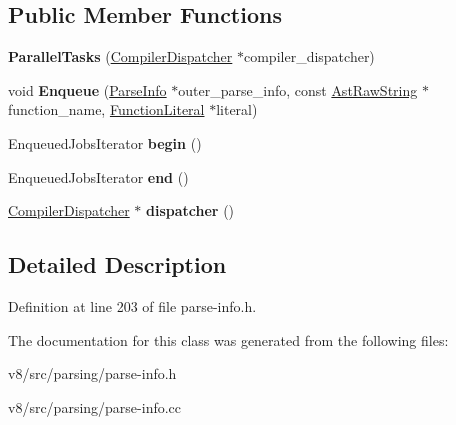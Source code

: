 \subsection*{Public Member Functions}
\begin{DoxyCompactItemize}
\item 
\mbox{\label{classv8_1_1internal_1_1ParseInfo_1_1ParallelTasks_ab6c9b1890ec00beea7053a2049278453}} 
{\bfseries Parallel\+Tasks} (\mbox{\hyperlink{classv8_1_1internal_1_1CompilerDispatcher}{Compiler\+Dispatcher}} $\ast$compiler\+\_\+dispatcher)
\item 
\mbox{\label{classv8_1_1internal_1_1ParseInfo_1_1ParallelTasks_a00dfb7c15caca76ce10ca8aad45eeb9a}} 
void {\bfseries Enqueue} (\mbox{\hyperlink{classv8_1_1internal_1_1ParseInfo}{Parse\+Info}} $\ast$outer\+\_\+parse\+\_\+info, const \mbox{\hyperlink{classv8_1_1internal_1_1AstRawString}{Ast\+Raw\+String}} $\ast$function\+\_\+name, \mbox{\hyperlink{classv8_1_1internal_1_1FunctionLiteral}{Function\+Literal}} $\ast$literal)
\item 
\mbox{\label{classv8_1_1internal_1_1ParseInfo_1_1ParallelTasks_ad32fa2b3ff55bbd600d5851963cba460}} 
Enqueued\+Jobs\+Iterator {\bfseries begin} ()
\item 
\mbox{\label{classv8_1_1internal_1_1ParseInfo_1_1ParallelTasks_a341230e654cf9994d9b7fd2cef334513}} 
Enqueued\+Jobs\+Iterator {\bfseries end} ()
\item 
\mbox{\label{classv8_1_1internal_1_1ParseInfo_1_1ParallelTasks_aad2af6077f22ae8cbdac3e23b2ed9839}} 
\mbox{\hyperlink{classv8_1_1internal_1_1CompilerDispatcher}{Compiler\+Dispatcher}} $\ast$ {\bfseries dispatcher} ()
\end{DoxyCompactItemize}


\subsection{Detailed Description}


Definition at line 203 of file parse-\/info.\+h.



The documentation for this class was generated from the following files\+:\begin{DoxyCompactItemize}
\item 
v8/src/parsing/parse-\/info.\+h\item 
v8/src/parsing/parse-\/info.\+cc\end{DoxyCompactItemize}
